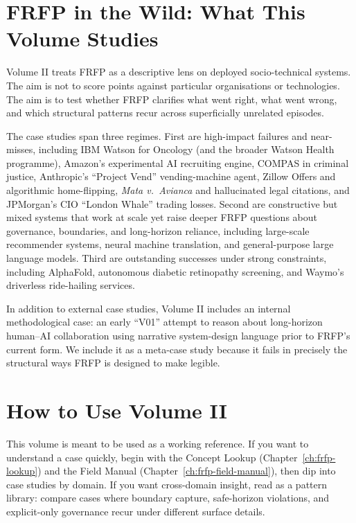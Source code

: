 \section{FRFP in the Wild: What This Volume Studies}

Volume II treats FRFP as a descriptive lens on deployed socio-technical systems. The aim is not to score points against particular organisations or technologies. The aim is to test whether FRFP clarifies what went right, what went wrong, and which structural patterns recur across superficially unrelated episodes.

The case studies span three regimes. First are high-impact failures and near-misses, including IBM Watson for Oncology (and the broader Watson Health programme), Amazon’s experimental AI recruiting engine, COMPAS in criminal justice, Anthropic’s ``Project Vend'' vending-machine agent, Zillow Offers and algorithmic home-flipping, \emph{Mata v.~Avianca} and hallucinated legal citations, and JPMorgan’s CIO ``London Whale'' trading losses. Second are constructive but mixed systems that work at scale yet raise deeper FRFP questions about governance, boundaries, and long-horizon reliance, including large-scale recommender systems, neural machine translation, and general-purpose large language models. Third are outstanding successes under strong constraints, including AlphaFold, autonomous diabetic retinopathy screening, and Waymo’s driverless ride-hailing services.

In addition to external case studies, Volume II includes an internal methodological case: an early ``V01'' attempt to reason about long-horizon human--AI collaboration using narrative system-design language prior to FRFP’s current form. We include it as a meta-case study because it fails in precisely the structural ways FRFP is designed to make legible.

\section{How to Use Volume II}

This volume is meant to be used as a working reference. If you want to understand a case quickly, begin with the Concept Lookup (Chapter~\ref{ch:frfp-lookup}) and the Field Manual (Chapter~\ref{ch:frfp-field-manual}), then dip into case studies by domain. If you want cross-domain insight, read as a pattern library: compare cases where boundary capture, safe-horizon violations, and explicit-only governance recur under different surface details.

